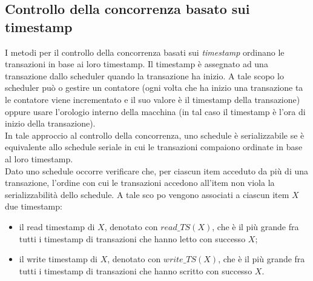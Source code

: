 \subsection{Controllo della concorrenza basato sui timestamp}
I metodi per il controllo della concorrenza basati sui \emph{timestamp} ordinano le transazioni in base ai
loro timestamp. Il timestamp è assegnato ad una transazione dallo scheduler quando la transazione
ha inizio. A tale scopo lo scheduler può o gestire un contatore (ogni volta che ha inizio una
transazione ta le contatore viene incrementato e il suo valore è il timestamp della transazione)
oppure usare l'orologio interno della macchina (in tal caso il timestamp è l'ora di inizio della
transazione).\\
In tale approccio al controllo della concorrenza, uno schedule è serializzabile se è equivalente allo
schedule seriale in cui le transazioni compaiono ordinate in base al loro timestamp.\\
Dato uno schedule occorre verificare che, per ciascun item acceduto da più di una transazione,
l'ordine con cui le transazioni accedono all'item non viola la serializzabilità dello schedule. A tale
sco po vengono associati a ciascun item $X$ due timestamp:
\begin{itemize}
 \item il read timestamp di $X$, denotato con $read\_TS(X)$, che è il più grande fra tutti i timestamp di
transazioni che hanno letto con successo $X$;
 \item il write timestamp di $X$, denotato con $write\_TS(X)$, che è il più grande fra tutti i timestamp di
transazioni che hanno scritto con successo $X$.
\end{itemize}

